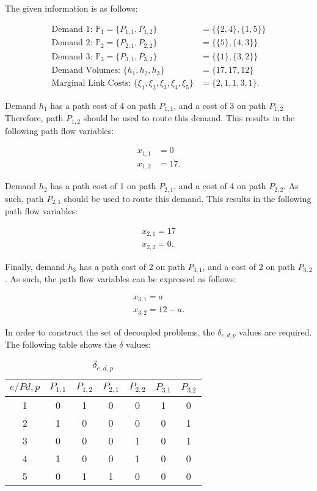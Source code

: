 The given information is as follows:

\begin{align*}
	\text{Demand 1: }\mathbb{P}_1 = \{P_{1,1},P_{1,2}\} &= \{\{2,4\},\{1,5\}\} \\
	\text{Demand 2: }\mathbb{P}_2 = \{P_{2,1},P_{2,2}\} &= \{\{5\},\{4,3\}\} \\
	\text{Demand 3: }\mathbb{P}_3 = \{P_{3,1},P_{3,2}\} &= \{\{1\},\{3,2\}\} \\
	\text{Demand Volumes: } \{h_1, h_2, h_3\} &= \{17, 17, 12\} \\
	\text{Marginal Link Costs: } \{\xi_1, \xi_2, \xi_3, \xi_4, \xi_5\} &=
	\{2,1,1,3,1\}
.\end{align*}

Demand $h_1$ has a path cost of 4 on path $P_{1,1}$, and a cost of 3 on path
$P_{1,2}$ Therefore, path $P_{1,2}$ should be used to route this demand. This
results in the following path flow variables:

 \begin{align*}
	 x_{1,1} &= 0 \\
	 x_{1,2} &= 17
.\end{align*}

Demand $h_2$ has a path cost of 1 on path $P_{2,1}$, and a cost of 4 on path
$P_{2,2}$. As such, path $P_{2,1}$ should be used to route this demand. This
results in the following path flow variables:

 \begin{align*}
	 x_{2,1} = 17 \\
	 x_{2,2} = 0
.\end{align*}

Finally, demand $h_3$ has a path cost of 2 on path $P_{3,1}$, and a cost of 2 on
path $P_{3,2}$. As such, the path flow variables can be expressed as follows:

\begin{align*}
	x_{3,1} = a \\
	x_{3,2} = 12-a
.\end{align*}

In order to construct the set of decoupled problems, the $\delta_{e,d,p}$ values are required. The following table shows the $\delta$ values:

\begin{table}[H]
	\centering
	\caption{$\delta_{e,d,p}$}
	\label{tab:label}
	\begin{tabular}{||c|c|c|c|c|c|c||}
	\hline
	\rowcolor{gray!50}
	$e/P{d,p}$ & $P_{1,1}$ & $P_{1,2}$ & $P_{2,1}$ & $P_{2,2}$ & $P_{3.1}$ &
	$P_{3.2}$\\
	\hline
	1 & 0 & 1 & 0 & 0 & 1 & 0 \\
	2 & 1 & 0 & 0 & 0 & 0 & 1 \\
	3 & 0 & 0 & 0 & 1 & 0 & 1 \\
	4 & 1 & 0 & 0 & 1 & 0 & 0 \\
	5 & 0 & 1 & 1 & 0 & 0 & 0 \\
	\hline\hline
	\end{tabular}
\end{table}

